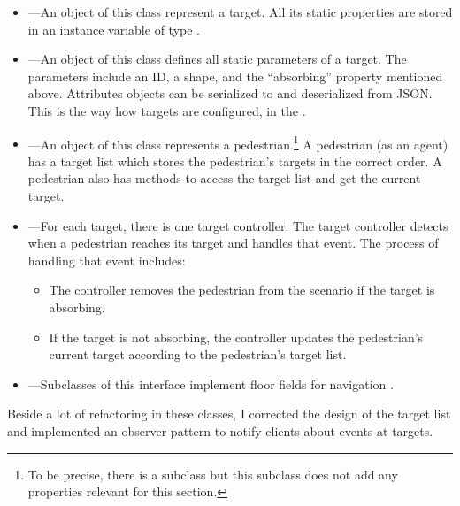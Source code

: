 \begin{itemize}

  \item {}---An object of this class represent a target.
    All its static properties are stored in an instance variable of type
    .

  \item {}---An object of this class defines all static
    parameters of a target.
    The parameters include an \acs{ID}, a shape, and the ``absorbing'' property
    mentioned above.
    Attributes objects can be serialized to and deserialized from \acs{JSON}.
    This is the way how targets are configured, \eg in the \vaderegui.

  \item {}---An object of this class represents a
    pedestrian.\footnote{To be precise, there is a subclass 
    but this subclass does not add any properties relevant for this section.}
    A pedestrian (as an agent) has a target list which stores the pedestrian's
    targets in the correct order.
    A pedestrian also has methods to access the target list and get the current
    target.

  \item {}---For each target, there is one target controller.
    The target controller detects when a pedestrian reaches its target and
    handles that event.
    The process of handling that event includes:

    \begin{itemize}[noitemsep,nolistsep]
      \item The controller removes the pedestrian from the scenario if the
        target is absorbing.
      \item If the target is not absorbing, the controller updates the
        pedestrian's current target according to the pedestrian's target list.
    \end{itemize}

  \item {}---Subclasses of this interface implement
    floor fields for navigation \citep{kirik-2007,kirik-2009,koster-2014b}.

\end{itemize}

Beside a lot of refactoring in these classes, I corrected the design of the
target list and implemented an observer pattern \citep{gamma-1995} to notify
clients about events at targets.

